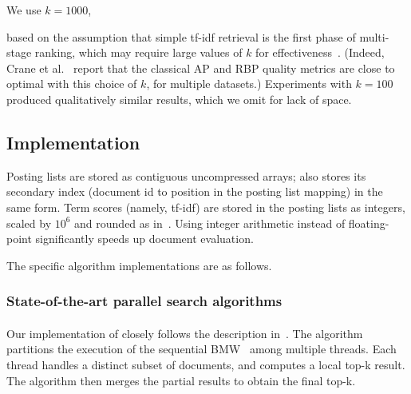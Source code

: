 We use  $k=1000$, {based on the assumption that simple tf-idf retrieval is the first phase of multi-stage ranking, 
which may require large values of $k$ for effectiveness~\cite{Wang:2011}. (Indeed, Crane et al.~\cite{Crane:2017} report
that the classical AP and RBP quality metrics are close to optimal with this choice of $k$, for multiple datasets.)
Experiments with $k=100$ produced qualitatively similar results, which we omit for lack of space.


\subsection{Implementation}
\label{ssec:implementation}

Posting lists are stored as contiguous uncompressed arrays;  {\pRA} also stores 
its secondary index (document id to position in the posting list mapping) in the same form. 
Term scores (namely, tf-idf) are stored in the posting lists as integers, scaled by $10^6$ and rounded as in~\cite{Bortnikov:2017}. 
Using integer arithmetic instead of floating-point significantly speeds up document evaluation. 

The specific algorithm implementations are as follows.

\subsubsection{State-of-the-art parallel search algorithms}

\paragraph{\pBMW}
Our implementation of {\pBMW} closely follows the description in~\cite{rojas2013distributing}. The algorithm partitions the execution of the 
sequential BMW~\cite{Ding:2011} among multiple threads. Each thread handles a distinct subset of documents, and computes a local top-k 
result. The algorithm then merges the partial results to obtain the final top-k. 

}
